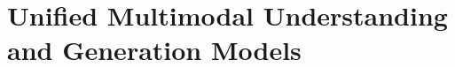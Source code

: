 \setcounter{chapter}{28}

\hypertarget{unified-multimodal-understanding-and-generation-models}{%
\chapter{Unified Multimodal Understanding and Generation Models}\label{unified-multimodal-understanding-and-generation-models}}
